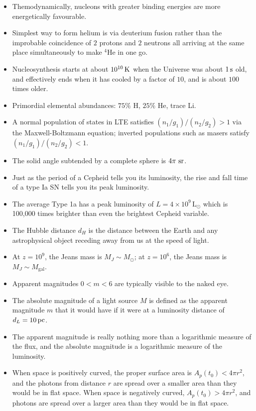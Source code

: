 \documentclass[a4paper,11pt]{article}
\begin{document}
\begin{itemize}
    \item Themodynamically, nucleons with greater binding energies are more energetically favourable.
    \item Simplest way to form helium is via deuterium fusion rather than the improbable coincidence of $2$ protons and $2$ neutrons all arriving at the same place simultaneously to make $^4$He in one go.
    \item Nucleosynthesis starts at about $10^{10}\,{\rm K}$ when the Universe was about $1\,{\rm s}$ old, and effectively ends when it has cooled by a factor of $10$, and is about $100$ times older.
    \item Primordial elemental abundances: $75\%$ H, $25\%$ He, trace Li.
    \item A normal population of states in LTE satisfies $(n_1/g_1)/(n_2/g_2)>1$ via the Maxwell-Boltzmann equation; inverted populations such as masers satisfy $(n_1/g_1)/(n_2/g_2)<1$.
    \item The solid angle subtended by a complete sphere is $4\pi~{\rm sr}$.
    \item Just as the period of a Cepheid tells you its luminosity, the rise and fall time of a type Ia SN tells you its peak luminosity.
    \item The average Type 1a has a peak luminosity of $L=4\times10^9\,\mathrm{L}_\odot$ which is 100,000 times brighter than even the brightest Cepheid variable.
    \item The Hubble distance $d_H$ is the distance between the Earth and any astrophysical object receding away from us at the speed of light.
    \item At $z=10^9$, the Jeans mass is $M_J\sim M_\odot$; at $z=10^6$, the Jeans mass is $M_J\sim M_\mathrm{gal}$.
    \item Apparent magnitudes $0<m<6$ are typically visible to the naked eye.
    \item The absolute magnitude of a light source $M$ is defined as the apparent magnitude $m$ that it would have if it were at a luminosity distance of $d_L = 10\,{\rm pc}$.
    \item The apparent magnitude is really nothing more than a logarithmic measure of the flux, and the absolute magnitude is a logarithmic measure of the luminosity.
    \item When space is positively curved, the proper surface area is $A_p(t_0) < 4\pi r^2$, and the photons from distance $r$ are spread over a smaller area than they would be in flat space. When space is negatively curved, $A_p(t_0) > 4\pi r^2$, and photons are spread over a larger area than they would be in flat space.

\end{itemize}
\end{document}
